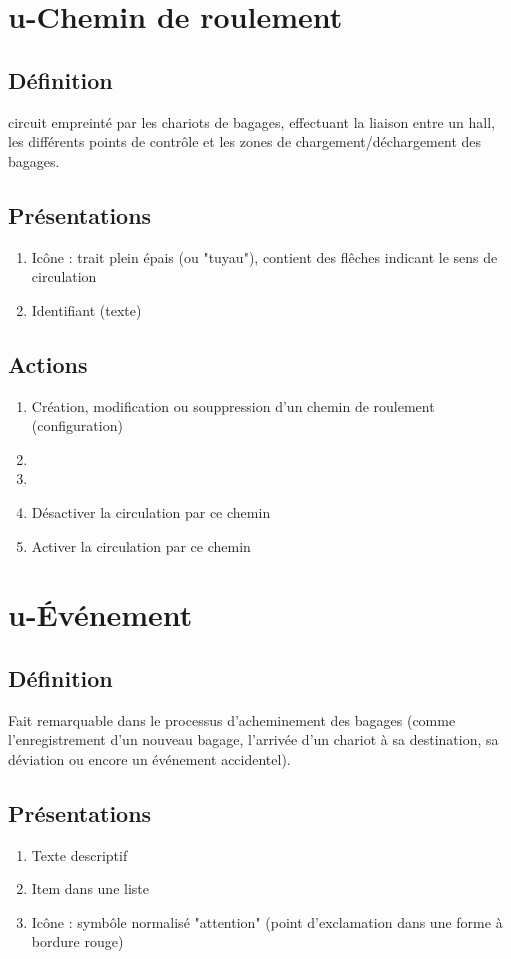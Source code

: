 \section{u-Chemin de roulement}
\subsection{Définition}
	circuit empreinté par les chariots de bagages, effectuant la liaison entre un hall, les différents points de contrôle
	et les zones de chargement/déchargement des bagages.

\subsection{Présentations}
\begin{enumerate}
	\item Icône : trait plein épais (ou "tuyau"), contient des flêches indicant le sens de circulation
	\item Identifiant (texte)
\end{enumerate}

\subsection{Actions}
\begin{enumerate}
	\item Création, modification ou souppression d'un chemin de roulement (configuration)
	\item \etat
	\item \transit
	\item Désactiver la circulation par ce chemin
	\item Activer la circulation par ce chemin
\end{enumerate}

\section{u-Événement}
\subsection{Définition}
	Fait remarquable dans le processus d'acheminement des bagages (comme l'enregistrement d'un nouveau bagage, l'arrivée
	d'un chariot à sa destination, sa déviation ou encore un événement accidentel).

\subsection{Présentations}
\begin{enumerate}
	\item Texte descriptif
	\item Item dans une liste
	\item Icône : symbôle normalisé "attention" (point d'exclamation dans une forme à bordure rouge)
\end{enumerate}

